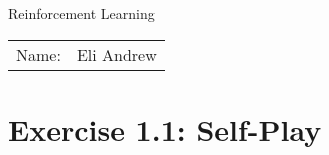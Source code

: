 \documentclass[12pt]{article}
\begin{document}
\begin{center}
{\Large Reinforcement Learning}

\begin{tabular}{rl}
Name: & Eli Andrew
\end{tabular}
\end{center}

\section{Exercise 1.1: Self-Play}
\end{document}
